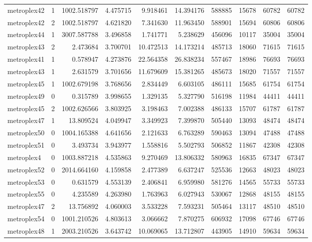 \documentclass[../../../thesis.tex]{subfiles}
\begin{document}
\begin{longtable}{|l|r|r|r|r|r|r|r|r|r|}
metroplex42 & 1 & 1002.518797 & 4.475715 & 9.918461 & 14.394176 & 588885 & 15678 & 60782 & 60782 \\
metroplex42 & 2 & 1002.518797 & 4.621820 & 7.341630 & 11.963450 & 588901 & 15694 & 60806 & 60806 \\
metroplex44 & 1 & 3007.587788 & 3.496858 & 1.741771 & 5.238629 & 456096 & 10117 & 35004 & 35004 \\
metroplex43 & 2 & 2.473684 & 3.700701 & 10.472513 & 14.173214 & 485713 & 18060 & 71615 & 71615 \\
metroplex41 & 1 & 0.578947 & 4.273876 & 22.564358 & 26.838234 & 557467 & 18986 & 76693 & 76693 \\
metroplex43 & 1 & 2.631579 & 3.701656 & 11.679609 & 15.381265 & 485673 & 18020 & 71557 & 71557 \\
metroplex45 & 1 & 1002.679198 & 3.768656 & 2.834449 & 6.603105 & 486111 & 15685 & 61754 & 61754 \\
metroplex49 & 0 & 0.315789 & 3.998655 & 1.329135 & 5.327790 & 516198 & 11984 & 44411 & 44411 \\
metroplex45 & 2 & 1002.626566 & 3.803925 & 3.198463 & 7.002388 & 486133 & 15707 & 61787 & 61787 \\
metroplex47 & 1 & 13.809524 & 4.049947 & 3.349923 & 7.399870 & 505440 & 13093 & 48474 & 48474 \\
metroplex50 & 0 & 1004.165388 & 4.641656 & 2.121633 & 6.763289 & 590463 & 13094 & 47488 & 47488 \\
metroplex51 & 0 & 3.493734 & 3.943977 & 1.558816 & 5.502793 & 506852 & 11867 & 42308 & 42308 \\
metroplex4 & 0 & 1003.887218 & 4.535863 & 9.270469 & 13.806332 & 580963 & 16835 & 67347 & 67347 \\
metroplex52 & 0 & 2014.664160 & 4.159858 & 2.477389 & 6.637247 & 525536 & 12663 & 48023 & 48023 \\
metroplex53 & 0 & 0.631579 & 4.553139 & 2.406841 & 6.959980 & 581276 & 14565 & 55733 & 55733 \\
metroplex55 & 0 & 4.235589 & 4.263980 & 1.763963 & 6.027943 & 530067 & 12868 & 48155 & 48155 \\
metroplex47 & 2 & 13.756892 & 4.060003 & 3.533228 & 7.593231 & 505464 & 13117 & 48510 & 48510 \\
metroplex54 & 0 & 1001.210526 & 4.803613 & 3.066662 & 7.870275 & 606932 & 17098 & 67746 & 67746 \\
metroplex48 & 1 & 2003.210526 & 3.643742 & 10.069065 & 13.712807 & 443905 & 14910 & 59634 & 59634 \\

\end{longtable}
\end{document}
